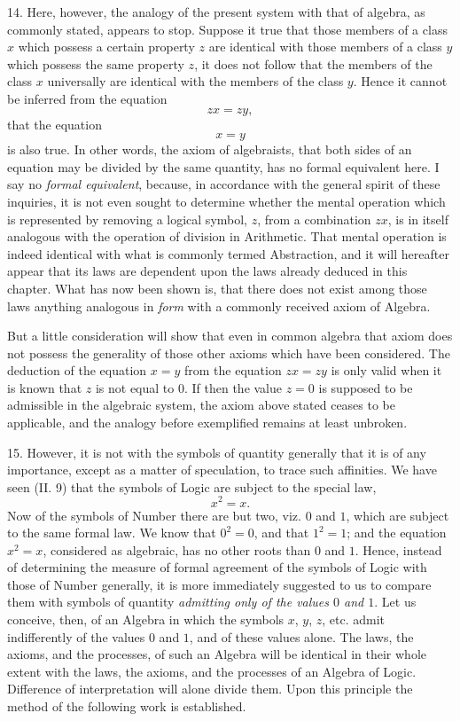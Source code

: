 \documentclass[oneside]{book}
\begin{document}
14. Here, however, the analogy of the present system with
that of algebra, as commonly stated, appears to stop. Suppose it
true that those members of a class $x$ which possess a certain property
$z$ are identical with those members of a class $y$ which possess
the same property $z$, it does not follow that the members of
the class $x$ universally are identical with the members of the
class $y$. Hence it cannot be inferred from the equation
\[
zx = zy,
\]
that the equation
\[
x = y
\]
is also true. In other words, the axiom of algebraists, that both
sides of an equation may be divided by the same quantity, has no
formal equivalent here. I say no \textit{formal equivalent}, because, in
accordance with the general spirit of these inquiries, it is not
even sought to determine whether the mental operation which is
represented by removing a logical symbol, $z$, from a combination
$zx$, is in itself analogous with the operation of division in Arithmetic.
That mental operation is indeed identical with what is
commonly termed Abstraction, and it will hereafter appear that
its laws are dependent upon the laws already deduced in this
chapter. What has now been shown is, that there does not
exist among those laws anything analogous in \textit{form} with a commonly
received axiom of Algebra.

But a little consideration will show that even in common
algebra that axiom does not possess the generality of those other
axioms which have been considered. The deduction of the
equation $x = y$ from the equation $zx = zy$ is only valid when it
is known that $z$ is not equal to $0$. If then the value $z = 0$ is
supposed to be admissible in the algebraic system, the axiom
above stated ceases to be applicable, and the analogy before exemplified
remains at least unbroken.

15. However, it is not with the symbols of quantity generally
that it is of any importance, except as a matter of speculation, to
trace such affinities. We have seen (II. 9) that the symbols of
Logic are subject to the special law,
\[
x^2 = x.
\]
Now of the symbols of Number there are but two, viz. $0$ and $1$,
which are subject to the same formal law. We know that $0^2 = 0$,
and that $1^2 = 1$; and the equation $x^2 = x$, considered as algebraic,
has no other roots than $0$ and $1$. Hence, instead of determining
the measure of formal agreement of the symbols of Logic with
those of Number generally, it is more immediately suggested to
us to compare them with symbols of quantity \textit{admitting only of
the values $0$ and $1$}. Let us conceive, then, of an Algebra in
which the symbols $x$, $y$, $z$, etc. admit indifferently of the values
$0$ and $1$, and of these values alone. The laws, the axioms, and
the processes, of such an Algebra will be identical in their whole
extent with the laws, the axioms, and the processes of an Algebra
of Logic. Difference of interpretation will alone divide
them. Upon this principle the method of the following work is
established.
\end{document}
